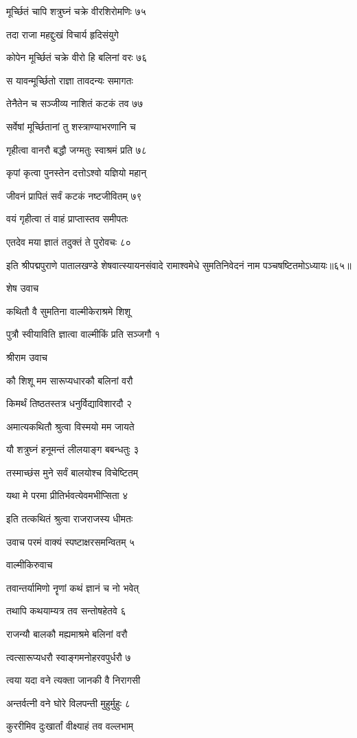 मूर्च्छितं चापि शत्रुघ्नं चक्रे वीरशिरोमणिः ७५

तदा राजा महद्दुःखं विचार्य हृदिसंयुगे

कोपेन मूर्च्छितं चक्रे वीरो हि बलिनां वरः ७६

स यावन्मूर्च्छितो राज्ञा तावदन्यः समागतः

तेनैतेन च सञ्जीव्य नाशितं कटकं तव ७७

सर्वेषां मूर्च्छितानां तु शस्त्राण्याभरणानि च

गृहीत्वा वानरौ बद्धौ जग्मतुः स्वाश्रमं प्रति ७८

कृपां कृत्वा पुनस्तेन दत्तोऽश्वो यज्ञियो महान्

जीवनं प्रापितं सर्वं कटकं नष्टजीवितम् ७९

वयं गृहीत्वा तं वाहं प्राप्तास्तव समीपतः

एतदेव मया ज्ञातं तदुक्तं ते पुरोवचः ८०

इति श्रीपद्मपुराणे पातालखण्डे शेषवात्स्यायनसंवादे रामाश्वमेधे सुमतिनिवेदनं नाम पञ्चषष्टितमोऽध्यायः॥६५॥


शेष उवाच

कथितौ वै सुमतिना वाल्मीकेराश्रमे शिशू

पुत्रौ स्वीयाविति ज्ञात्वा वाल्मीकिं प्रति सञ्जगौ १

श्रीराम उवाच

कौ शिशू मम सारूप्यधारकौ बलिनां वरौ

किमर्थं तिष्ठतस्तत्र धनुर्विद्याविशारदौ २

अमात्यकथितौ श्रुत्वा विस्मयो मम जायते

यौ शत्रुघ्नं हनूमन्तं लीलयाङ्ग बबन्धतुः ३

तस्माच्छंस मुने सर्वं बालयोश्च विचेष्टितम्

यथा मे परमा प्रीतिर्भवत्येवमभीप्सिता ४

इति तत्कथितं श्रुत्वा राजराजस्य धीमतः

उवाच परमं वाक्यं स्पष्टाक्षरसमन्वितम् ५

वाल्मीकिरुवाच

तवान्तर्यामिणो नॄणां कथं ज्ञानं च नो भवेत्

तथापि कथयाम्यत्र तव सन्तोषहेतवे ६

राजन्यौ बालकौ मह्यमाश्रमे बलिनां वरौ

त्वत्सारूप्यधरौ स्वाङ्गमनोहरवपुर्धरौ ७

त्वया यदा वने त्यक्ता जानकी वै निरागसी

अन्तर्वत्नी वने घोरे विलपन्ती मुहुर्मुहुः ८

कुररीमिव दुःखार्तां वीक्ष्याहं तव वल्लभाम्

